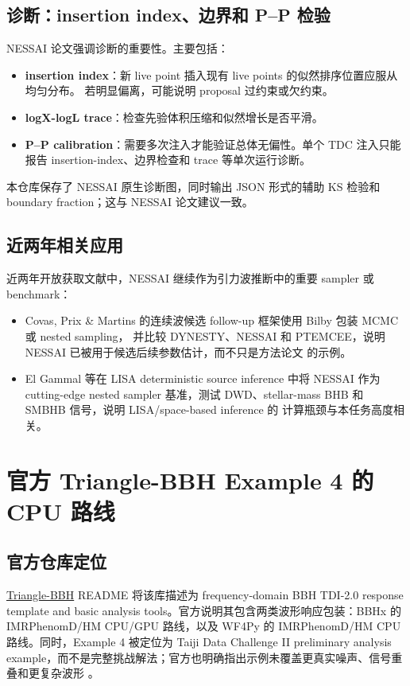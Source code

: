 \documentclass[11pt,a4paper]{ctexart}
\newcommand{\official}{\href{https://github.com/TriangleDataCenter/Triangle-BBH}{Triangle-BBH}}
\begin{document}
\subsection{诊断：insertion index、边界和 P--P 检验}

NESSAI 论文强调诊断的重要性。主要包括：
\begin{itemize}
  \item \textbf{insertion index}：新 live point 插入现有 live points 的似然排序位置应服从均匀分布。
  若明显偏离，可能说明 proposal 过约束或欠约束。
  \item \textbf{logX-logL trace}：检查先验体积压缩和似然增长是否平滑。
  \item \textbf{P--P calibration}：需要多次注入才能验证总体无偏性。单个 TDC 注入只能报告
  insertion-index、边界检查和 trace 等单次运行诊断。
\end{itemize}

本仓库保存了 NESSAI 原生诊断图，同时输出 JSON 形式的辅助 KS 检验和 boundary fraction；这与
NESSAI 论文建议一致。

\subsection{近两年相关应用}

近两年开放获取文献中，NESSAI 继续作为引力波推断中的重要 sampler 或 benchmark：
\begin{itemize}
  \item Covas, Prix \& Martins 的连续波候选 follow-up 框架使用 Bilby 包装 MCMC 或 nested sampling，
  并比较 DYNESTY、NESSAI 和 PTEMCEE，说明 NESSAI 已被用于候选后续参数估计，而不只是方法论文
  的示例\cite{covas2024cwfollowup}。
  \item El Gammal 等在 LISA deterministic source inference 中将 NESSAI 作为 cutting-edge nested
  sampler 基准，测试 DWD、stellar-mass BHB 和 SMBHB 信号，说明 LISA/space-based inference 的
  计算瓶颈与本任务高度相关\cite{elgammal2025lisa}。
\end{itemize}

\section{官方 Triangle-BBH Example 4 的 CPU 路线}

\subsection{官方仓库定位}

\official{} README 将该库描述为 frequency-domain BBH TDI-2.0 response template and basic analysis
tools。官方说明其包含两类波形响应包装：BBHx 的 IMRPhenomD/HM CPU/GPU 路线，以及 WF4Py 的
IMRPhenomD/HM CPU 路线。同时，Example 4 被定位为 Taiji Data Challenge II preliminary analysis
example，而不是完整挑战解法；官方也明确指出示例未覆盖更真实噪声、信号重叠和更复杂波形
\cite{trianglebbh}。
\end{document}
